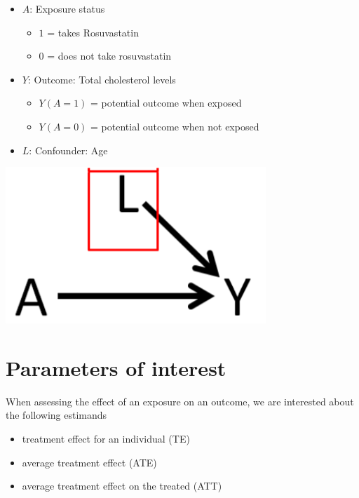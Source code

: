 \documentclass[
]{book}
\providecommand{\tightlist}{%
  \setlength{\itemsep}{0pt}\setlength{\parskip}{0pt}}
\begin{document}
\begin{itemize}
\tightlist
\item
  \(A\): Exposure status

  \begin{itemize}
  \tightlist
  \item
    \(1\) = takes Rosuvastatin
  \item
    \(0\) = does not take rosuvastatin
  \end{itemize}
\item
  \(Y\): Outcome: Total cholesterol levels

  \begin{itemize}
  \tightlist
  \item
    \(Y(A=1)\) = potential outcome when exposed
  \item
    \(Y(A=0)\) = potential outcome when not exposed
  \end{itemize}
\item
  \(L\): Confounder: Age
\end{itemize}

\includegraphics{images/RCT.png}

\hypertarget{parameters-of-interest}{%
\section{Parameters of interest}\label{parameters-of-interest}}

When assessing the effect of an exposure on an outcome, we are interested about the following estimands

\begin{itemize}
\tightlist
\item
  treatment effect for an individual (TE)
\item
  average treatment effect (ATE)
\item
  average treatment effect on the treated (ATT)
\end{itemize}
\end{document}

